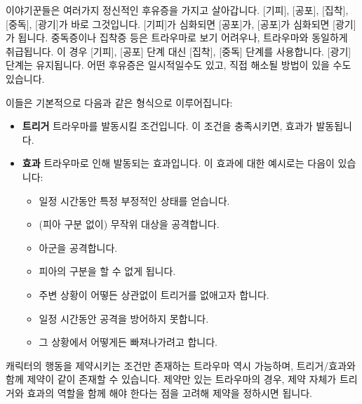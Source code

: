 \documentclass{report}
\begin{document}
	이야기꾼들은 여러가지 정신적인 후유증을 가지고 살아갑니다. [기피], [공포], [집착], [중독], [광기]가 바로 그것입니다. [기피]가 심화되면 [공포]가, [공포]가 심화되면 [광기]가 됩니다. 중독증이나 집착증 등은 트라우마로 보기 어려우나, 트라우마와 동일하게 취급됩니다. 이 경우 [기피], [공포] 단계 대신 [집착], [중독] 단계를 사용합니다. [광기] 단계는 유지됩니다. 어떤 후유증은 일시적일수도 있고, 직접 해소될 방법이 있을 수도 있습니다.
	
	이들은 기본적으로 다음과 같은 형식으로 이루어집니다:
	
	\begin{itemize}
		\item \textbf{트리거}
		\subitem 트라우마를 발동시킬 조건입니다. 이 조건을 충족시키면, 효과가 발동됩니다.
		
		\item \textbf{효과}
		\subitem 트라우마로 인해 발동되는 효과입니다. 이 효과에 대한 예시로는 다음이 있습니다:
		\begin{itemize}
			\item 일정 시간동안 특정 부정적인 상태를 얻습니다.
			\item (피아 구분 없이) 무작위 대상을 공격합니다.
			\item 아군을 공격합니다.
			\item 피아의 구분을 할 수 없게 됩니다.
			\item 주변 상황이 어떻든 상관없이 트리거를 없애고자 합니다.
			\item 일정 시간동안 공격을 방어하지 못합니다.
			\item 그 상황에서 어떻게든 빠져나가려고 합니다.
		\end{itemize}
	\end{itemize}
	
	캐릭터의 행동을 제약시키는 조건만 존재하는 트라우마 역시 가능하며, 트리거/효과와 함께 제약이 같이 존재할 수 있습니다. 제약만 있는 트라우마의 경우, 제약 자체가 트리거와 효과의 역할을 함께 해야 한다는 점을 고려해 제약을 정하시면 됩니다.
\end{document}
